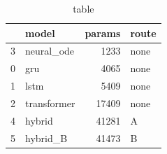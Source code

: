 \begin{table}
\caption{table}
\label{tab:table}
\begin{tabular}{llrl}
\toprule
 & model & params & route \\
\midrule
3 & neural\_ode & 1233 & none \\
0 & gru & 4065 & none \\
1 & lstm & 5409 & none \\
2 & transformer & 17409 & none \\
4 & hybrid & 41281 & A \\
5 & hybrid\_B & 41473 & B \\
\bottomrule
\end{tabular}
\end{table}
